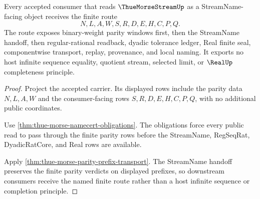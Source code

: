 \begin{theorem}\label{thm:thue-morse-parity-stream-handoff}
Every accepted consumer that reads $\ThueMorseStreamUp$ as a StreamName-facing object receives the finite route
$$
N,L,A,W,S,R,D,E,H,C,P,Q .
$$
The route exposes binary-weight parity windows first, then the StreamName handoff, then regular-rational readback, dyadic tolerance ledger, Real finite seal, componentwise transport, replay, provenance, and local naming. It exports no host infinite sequence equality, quotient stream, selected limit, or $\RealUp$ completeness principle.
\end{theorem}
\begin{proof}
Project the accepted carrier. Its displayed rows include the parity data $N,L,A,W$ and the consumer-facing rows $S,R,D,E,H,C,P,Q$, with no additional public coordinates.

Use \autoref{thm:thue-morse-namecert-obligations}. The obligations force every public read to pass through the finite parity rows before the StreamName, RegSeqRat, DyadicRatCore, and Real rows are available.

Apply \autoref{thm:thue-morse-parity-prefix-transport}. The StreamName handoff preserves the finite parity verdicts on displayed prefixes, so downstream consumers receive the named finite route rather than a host infinite sequence or completion principle.
\end{proof}




